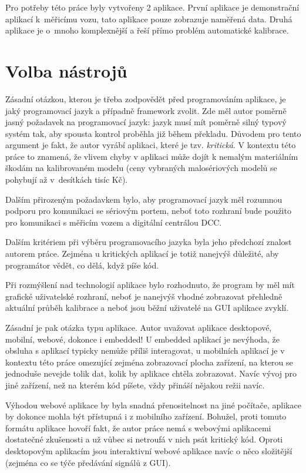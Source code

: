 Pro potřeby této práce byly vytvořeny 2 aplikace. První aplikace je
demonstrační aplikací k~měřicímu vozu, tato aplikace pouze zobrazuje naměřená
data. Druhá aplikace je o~mnoho komplexnější a řeší přímo problém automatické
kalibrace.

\section{Volba nástrojů}
\label{sec:sw-nastroje}

Zásadní otázkou, kterou je třeba zodpovědět před programováním aplikace, je
jaký programovací jazyk a případně framework zvolit. Zde měl autor poměrně
jasný požadavek na programovací jazyk: jazyk musí mít poměrně silný typový
systém tak, aby spousta kontrol proběhla již během překladu. Důvodem pro tento
argument je fakt, že autor vyrábí aplikaci, které je tzv. \textit{kritická}.
V kontextu této práce to znamená, že vlivem chyby v aplikaci může dojít
k nemalým materiálním škodám na kalibrovaném modelu (ceny vybraných
malosériových modelů se pohybují až v~desítkách tisíc Kč).

Dalším přirozeným požadavkem bylo, aby programovací jazyk měl rozumnou podporu
pro komunikaci se sériovým portem, neboť toto rozhraní bude použito pro
komunikaci s měřicím vozem a digitální centrálou DCC.

Dalším kritériem při výběru programovacího jazyka byla jeho předchozí znalost
autorem práce. Zejména u kritických aplikací je totiž nanejvýš důležité, aby
programátor vědět, co dělá, když píše kód.

Při rozmýšlení nad technologií aplikace bylo rozhodnuto, že program by měl
mít grafické uživatelské rozhraní, neboť je nanejvýš vhodné zobrazovat přehledně
aktuální průběh kalibrace a neboť jsou běžní uživatelé na GUI aplikace zvyklí.

Zásadní je pak otázka typu aplikace. Autor uvažovat aplikace desktopové,
mobilní, webové, dokonce i embedded! U embedded aplikací je nevýhoda, že
obsluha s aplikací typicky nemůže příliš interagovat, u mobilních aplikací
je v kontextu této práce omezující zejména zobrazovací plocha zařízení, na
kterou se jednoduše nevejde tolik dat, kolik by aplikace chtěla zobrazovat.
Navíc vývoj pro jiné zařízení, než na kterém kód píšete, vždy přináší nějakou
režii navíc.

Výhodou webové aplikace by byla snadná přenositelnost na jiné počítače,
aplikace by dokonce mohla být přístupná i z mobilního zařízení. Bohužel, proti
tomuto formátu aplikace hovoří fakt, že autor práce nemá s webovými aplikacemi
dostatečné zkušenosti a už vůbec si netroufá v nich psát kritický kód.
Oproti desktopovým aplikacím jsou interaktivní webové aplikace navíc o něco
složitější (zejména co se týče předávání signálů z GUI).

